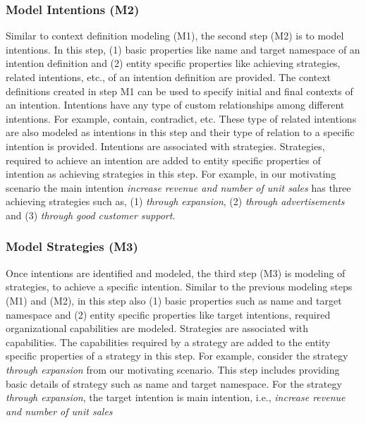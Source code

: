 \subsubsection{Model Intentions (M2)}  
Similar to context definition modeling (M1), the second step (M2) is to model intentions. In this step, (1) basic properties like name and target namespace of an intention definition and (2) entity specific properties like achieving strategies, related intentions, etc., of an intention definition are provided. The context definitions created in step M1 can be used to specify initial and final contexts of an intention. Intentions have any type of custom relationships among different intentions. For example, contain, contradict, etc. These type of related intentions are also modeled as intentions in this step and their type of relation to a specific intention is provided. Intentions are associated with strategies. Strategies, required to achieve an intention are added to entity specific properties of intention as achieving strategies in this step. For example, in our motivating scenario the main intention \textit{increase revenue and number of unit sales} has three achieving strategies such as, (1) \textit{through expansion}, (2) \textit{through advertisements} and (3) \textit{through good customer support}. 

\subsubsection{Model Strategies (M3)}  
Once intentions are identified and modeled, the third step (M3) is modeling of strategies, to achieve a specific intention. Similar to the previous modeling steps (M1) and (M2), in this step also (1) basic properties such as name and target namespace and (2) entity specific properties like target intentions, required organizational capabilities are modeled. Strategies are associated with capabilities. The capabilities required by a strategy are added to the entity specific properties of a strategy in this step. For example, consider the strategy \textit{through expansion} from our motivating scenario. This step includes providing basic details of strategy such as name and target namespace. For the strategy \textit{through expansion}, the target intention is main intention, i.e., \textit{increase revenue and number of unit sales}  

